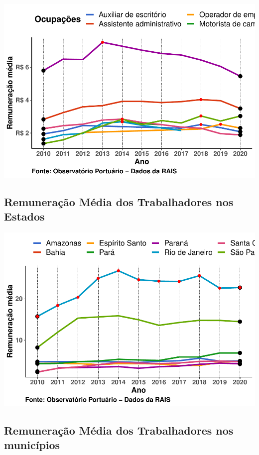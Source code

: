\documentclass[
]{article}
\begin{document}
\includegraphics{mercado_trabalho_files/figure-latex/g_operacao_ocupacao-1.pdf}

\hypertarget{remunerauxe7uxe3o-muxe9dia-dos-trabalhadores-nos-estados}{%
\subsection{Remuneração Média dos Trabalhadores nos
Estados}\label{remunerauxe7uxe3o-muxe9dia-dos-trabalhadores-nos-estados}}

\includegraphics{mercado_trabalho_files/figure-latex/g_operacao_estado-1.pdf}

\hypertarget{remunerauxe7uxe3o-muxe9dia-dos-trabalhadores-nos-municuxedpios}{%
\subsection{Remuneração Média dos Trabalhadores nos
municípios}\label{remunerauxe7uxe3o-muxe9dia-dos-trabalhadores-nos-municuxedpios}}
\end{document}
